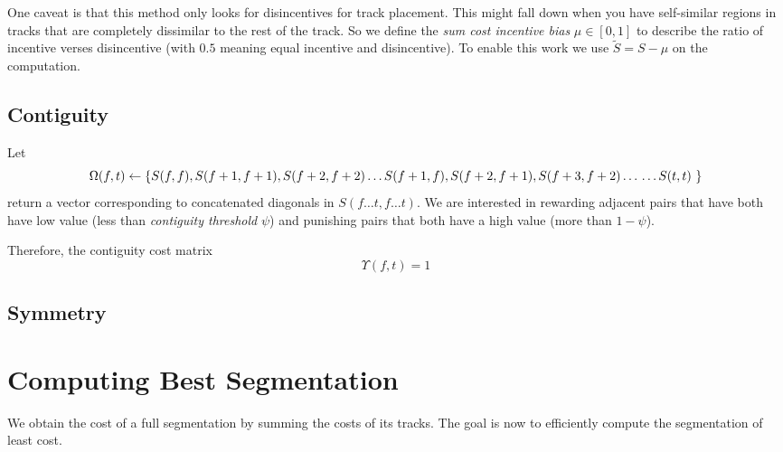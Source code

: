 \documentclass[twocolumn]{article}
\begin{document}
One caveat is that this method only looks for disincentives for track placement. This might fall down when you have self-similar regions in tracks that are completely dissimilar to the rest of the track. So we define the \textit{sum cost incentive bias} $\mu \in \left[0,1\right]$ to describe the ratio of incentive verses disincentive (with $0.5$ meaning equal incentive and disincentive). To enable this work we use $\tilde S=S-\mu$ on the computation.

\subsection{Contiguity}

Let \begin{dmath*}
	\Omega( f,t ) \leftarrow \left\{ \\
		S(f,f), S(f+1,f+1), S(f+2,f+2) \ldots \\
		S(f+1,f), S(f+2,f+1), S(f+3,f+2) \ldots \\
		\ldots \\
		S(t,t) 
		 ~ \right\}  
\end{dmath*} return a vector corresponding to concatenated diagonals in $S( f \ldots t, f \ldots t )$. We are interested in rewarding adjacent pairs that have both have low value (less than \textit{contiguity threshold} $\psi$) and punishing pairs that both have a high value (more than $1-\psi$).

Therefore, the contiguity cost matrix 
\begin{dmath*}
\Upsilon(f, t) = 1
\end{dmath*}

\subsection{Symmetry}


\section{Computing Best Segmentation}\label{best_cost}

We obtain the cost of a full segmentation by summing the costs of its tracks. The goal is now to efficiently compute the segmentation of least cost.
\end{document}
